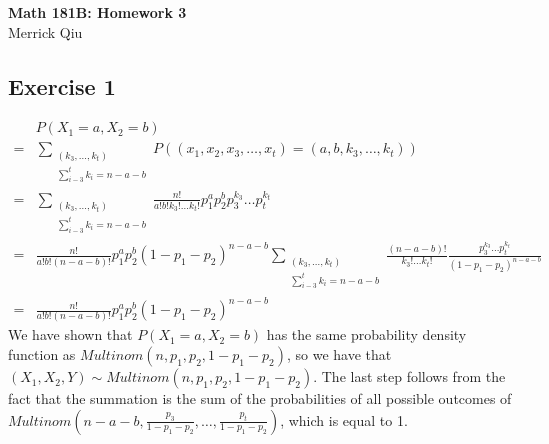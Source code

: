 \documentclass{article}
\begin{document}
\begin{center}
	\huge{\bf Math 181B: Homework 3} \\
	Merrick Qiu 
\end{center}

\subsection*{Exercise 1}
\begin{align*}
	&P(X_1=a, X_2=b)  \\
	= &\sum_{\substack{(k_3,\hdots,k_t) \\ \sum_{i-3}^t k_i = n-a-b}}
		P((x_1, x_2, x_3, \hdots, x_t) = (a,b,k_3,\hdots,k_t)) \\
	= &\sum_{\substack{(k_3,\hdots,k_t) \\ \sum_{i-3}^t k_i = n-a-b}}
		\frac{n!}{a!b!k_3!\hdots k_t!} p_1^a p_2^b p_3^{k_3} \hdots p_t^{k_t} \\
	= &\frac{n!}{a!b!(n-a-b)!} p_1^a p_2^b (1-p_1-p_2)^{n-a-b} \sum_{\substack{(k_3,\hdots,k_t) \\ \sum_{i-3}^t k_i = n-a-b}}
		\frac{(n-a-b)!}{k_3!\hdots k_t!}  \frac{p_3^{k_3} \hdots p_t^{k_t}}{(1-p_1-p_2)^{n-a-b}} \\
	= &\frac{n!}{a!b!(n-a-b)!} p_1^a p_2^b (1-p_1-p_2)^{n-a-b}
\end{align*}
We have shown that $P(X_1=a, X_2=b)$ has the same 
probability density function as $Multinom(n,p_1,p_2,1-p_1-p_2)$, 
so we have that  $(X_1,X_2,Y) \sim Multinom(n,p_1,p_2,1-p_1-p_2)$.
The last step follows from the fact that the summation is the sum of the probabilities of all
possible outcomes of $Multinom(n-a-b,\frac{p_3}{1-p_1-p_2},\hdots,\frac{p_t}{1-p_1-p_2})$,
which is equal to 1.
\newpage 
\end{document}
